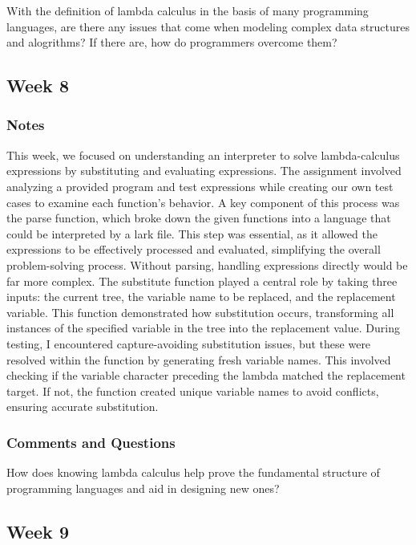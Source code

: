 \documentclass{article}
\theoremstyle{theorem}
\theoremstyle{definition}
\theoremstyle{remark}
\begin{document}
With the definition of lambda calculus in the basis of many programming languages, are there any issues that come when modeling complex data structures and alogrithms? If there are, how do programmers overcome them?

\subsection{Week 8}

\subsubsection{Notes}

This week, we focused on understanding an interpreter to solve lambda-calculus expressions 
by substituting and evaluating expressions. The assignment involved analyzing a provided 
program and test expressions while creating our own test cases to examine each function's 
behavior. A key component of this process was the parse function, which broke down the
 given functions into a language that could be interpreted by a lark file. This step was 
 essential, as it allowed the expressions to be effectively processed and evaluated, 
 simplifying the overall problem-solving process. Without parsing, handling expressions 
 directly would be far more complex. The substitute function played a central role by 
 taking three inputs: the current tree, the variable name to be replaced, and the replacement 
 variable. This function demonstrated how substitution occurs, transforming all instances of 
 the specified variable in the tree into the replacement value. During testing, I encountered 
 capture-avoiding substitution issues, but these were resolved within the function by 
 generating fresh variable names. This involved checking if the variable character 
 preceding the lambda matched the replacement target. If not, the function created 
 unique variable names to avoid conflicts, ensuring accurate substitution.

\subsubsection{Comments and Questions}

How does knowing lambda calculus help prove the fundamental structure of programming languages and aid in designing new ones?

\subsection{Week 9}
\end{document}
